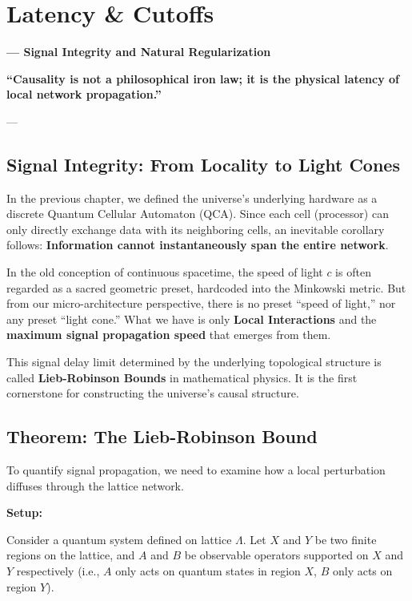 \documentclass[11pt,a4paper,twoside]{book}
\begin{document}
 \section{Latency \& Cutoffs}

\textbf{--- Signal Integrity and Natural Regularization}

\textbf{``Causality is not a philosophical iron law; it is the physical latency of local network propagation.''}

---

\subsection{Signal Integrity: From Locality to Light Cones}

In the previous chapter, we defined the universe's underlying hardware as a discrete Quantum Cellular Automaton (QCA). Since each cell (processor) can only directly exchange data with its neighboring cells, an inevitable corollary follows: \textbf{Information cannot instantaneously span the entire network}.

In the old conception of continuous spacetime, the speed of light \textbf{$c$} is often regarded as a sacred geometric preset, hardcoded into the Minkowski metric. But from our micro-architecture perspective, there is no preset ``speed of light,'' nor any preset ``light cone.'' What we have is only \textbf{Local Interactions} and the \textbf{maximum signal propagation speed} that emerges from them.

This signal delay limit determined by the underlying topological structure is called \textbf{Lieb-Robinson Bounds} in mathematical physics. It is the first cornerstone for constructing the universe's causal structure.

\subsection{Theorem: The Lieb-Robinson Bound}

To quantify signal propagation, we need to examine how a local perturbation diffuses through the lattice network.

\textbf{Setup:}

Consider a quantum system defined on lattice \textbf{$\Lambda$}. Let \textbf{$X$} and \textbf{$Y$} be two finite regions on the lattice, and \textbf{$A$} and \textbf{$B$} be observable operators supported on \textbf{$X$} and \textbf{$Y$} respectively (i.e., \textbf{$A$} only acts on quantum states in region \textbf{$X$}, \textbf{$B$} only acts on region \textbf{$Y$}).
\end{document}

